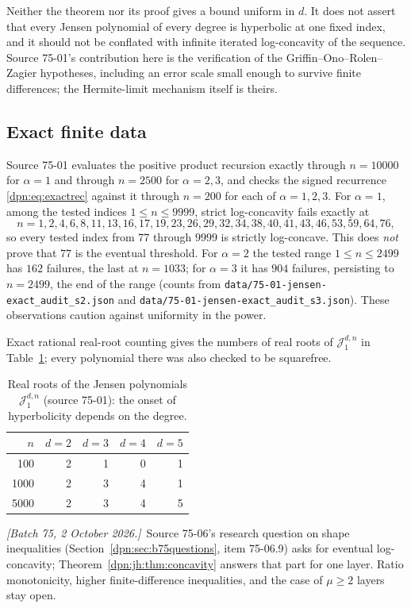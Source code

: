 \documentclass[11pt]{article}
\numberwithin{equation}{section}
\theoremstyle{definition}\newtheorem{definition}[theorem]{Definition}
\theoremstyle{remark}\newtheorem{remark}[theorem]{Remark}
\newcommand{\file}[1]{\nolinkurl{#1}}
\newcommand{\writenote}[1]{\par\smallskip\noindent\textit{[Batch 75, 2 October 2026.]}\ #1\par\smallskip}
\begin{document}
Neither the theorem nor its proof gives a bound uniform in $d$.  It does not
assert that every Jensen polynomial of every degree is hyperbolic at one fixed
index, and it should not be conflated with infinite iterated log-concavity of
the sequence.  Source 75-01's contribution here is the verification of the
Griffin--Ono--Rolen--Zagier hypotheses, including an error scale small enough
to survive finite differences; the Hermite-limit mechanism itself is theirs.

\subsection{Exact finite data}
Source 75-01 evaluates the positive product recursion exactly through $n=10000$
for $\alpha=1$ and through $n=2500$ for $\alpha=2,3$, and checks the signed
recurrence \eqref{dpn:eq:exactrec} against it through $n=200$ for each of
$\alpha=1,2,3$.  For $\alpha=1$, among the tested indices $1\le n\le9999$,
strict log-concavity fails exactly at
\[
 n=1,2,4,6,8,11,13,16,17,19,23,26,29,32,34,38,40,41,43,46,53,59,64,76,
\]
so every tested index from $77$ through $9999$ is strictly log-concave.  This
does \emph{not} prove that $77$ is the eventual threshold.  For $\alpha=2$ the
tested range $1\le n\le2499$ has $162$ failures, the last at $n=1033$; for
$\alpha=3$ it has $904$ failures, persisting to $n=2499$, the end of the range
(counts from \file{data/75-01-jensen-exact_audit_s2.json} and
\file{data/75-01-jensen-exact_audit_s3.json}).  These observations caution against uniformity in the
power.

Exact rational real-root counting gives the numbers of real roots of
$\mathcal J_1^{d,n}$ in Table~\ref{dpn:jh:tab:roots}; every polynomial there was
also checked to be squarefree.
\begin{table}[!htbp]
\centering\small
\begin{tabular}{rrrrr}
\toprule
$n$ & $d=2$ & $d=3$ & $d=4$ & $d=5$\\
\midrule
100 & 2 & 1 & 0 & 1\\
1000 & 2 & 3 & 4 & 1\\
5000 & 2 & 3 & 4 & 5\\
\bottomrule
\end{tabular}
\caption{Real roots of the Jensen polynomials $\mathcal J_1^{d,n}$ (source
75-01): the onset of hyperbolicity depends on the degree.}\label{dpn:jh:tab:roots}
\end{table}
\writenote{Source 75-06's research question on shape inequalities
(Section~\ref{dpn:sec:b75questions}, item 75-06.9) asks for eventual
log-concavity; Theorem~\ref{dpn:jh:thm:concavity} answers that part for one
layer.  Ratio monotonicity, higher finite-difference inequalities, and the
case of $\mu\ge2$ layers stay open.}
\end{document}
